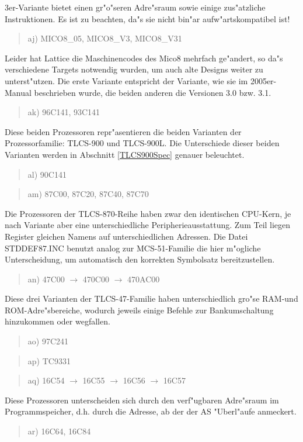 \documentclass[12pt,a4paper,twoside]{report}
\begin{document}
3er-Variante bietet einen gr"o"seren Adre"sraum sowie einige zus"atzliche
Instruktionen.  Es ist zu beachten, da"s sie nicht bin"ar
aufw"artskompatibel ist!
\begin{quote}
aj) MICO8\_05, MICO8\_V3, MICO8\_V31
\end{quote}
Leider hat Lattice die Maschinencodes des Mico8 mehrfach ge"andert, so
da"s verschiedene Targets notwendig wurden, um auch alte Designs weiter
zu unterst"utzen.  Die erste Variante entspricht der Variante, wie sie
im 2005er-Manual beschrieben wurde, die beiden anderen die Versionen 3.0
bzw. 3.1.
\begin{quote}
ak) 96C141, 93C141
\end{quote}
Diese beiden Prozessoren repr"asentieren die beiden Varianten der
Prozessorfamilie: TLCS-900 und TLCS-900L.  Die Unterschiede dieser beiden
Varianten werden in Abschnitt \ref{TLCS900Spec} genauer beleuchtet.
\begin{quote}
al) 90C141
\end{quote}
\begin{quote}
am) 87C00, 87C20, 87C40, 87C70
\end{quote}
Die Prozessoren der TLCS-870-Reihe haben zwar den identischen CPU-Kern, je
nach Variante aber eine unterschiedliche Peripherieausstattung.  Zum
Teil liegen Register gleichen Namens auf unterschiedlichen Adressen.
Die Datei STDDEF87.INC benutzt analog zur MCS-51-Familie die hier
m"ogliche Unterscheidung, um automatisch den korrekten Symbolsatz
bereitzustellen.
\begin{quote}
an) 47C00 $\rightarrow$ 470C00 $\rightarrow$ 470AC00
\end{quote}
Diese drei Varianten der TLCS-47-Familie haben unterschiedlich gro"se
RAM-und ROM-Adre"sbereiche, wodurch jeweils einige Befehle zur
Bankumschaltung hinzukommen oder wegfallen.
\begin{quote}
ao) 97C241
\end{quote}
\begin{quote}
ap) TC9331
\end{quote}
\begin{quote}
aq) 16C54 $\rightarrow$ 16C55 $\rightarrow$ 16C56 $\rightarrow$ 16C57
\end{quote}
Diese Prozessoren unterscheiden sich durch den verf"ugbaren
Adre"sraum im Programmspeicher, d.h. durch die Adresse, ab der
der AS "Uberl"aufe anmeckert.
\begin{quote}
ar) 16C64, 16C84
\end{quote}
\end{document}
